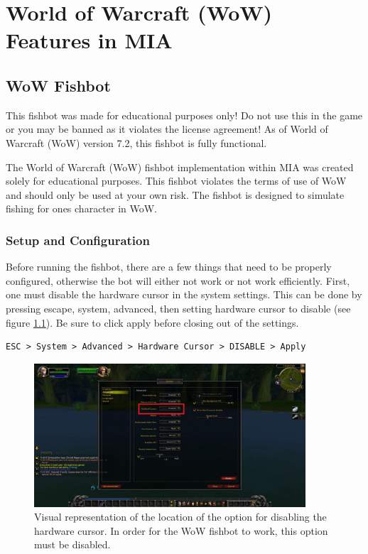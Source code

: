 \chapter{World of Warcraft (WoW) Features in MIA} \label{WoW}
\pagestyle{fancy}

\section{WoW Fishbot} \label{WoWFishbot}

\begin{note}
	This fishbot was made for educational purposes only! Do not use this in the game or you may be banned as it violates the license agreement! As of World of Warcraft (WoW) version 7.2, this fishbot is fully functional.
\end{note}

The World of Warcraft (WoW) fishbot implementation within MIA was created solely for educational purposes. This fishbot violates the terms of use of WoW and should only be used at your own risk. The fishbot is designed to simulate fishing for ones character in WoW. 

\subsection{Setup and Configuration}

Before running the fishbot, there are a few things that need to be properly configured, otherwise the bot will either not work or not work efficiently. First, one must disable the hardware cursor in the system settings. This can be done by pressing escape, system, advanced, then setting hardware cursor to disable (see figure \ref{hardwar cursor}). Be sure to click apply before closing out of the settings.

\begin{lstlisting}
ESC > System > Advanced > Hardware Cursor > DISABLE > Apply
\end{lstlisting}

\begin{figure}[h]
	\centering
	\includegraphics[width=0.9\textwidth]{Images/WoWScrnShot_040118_234154.jpg}
	\caption{Visual representation of the location of the option for disabling the hardware cursor. In order for the WoW fishbot to work, this option must be disabled.} \label{hardwar cursor}
\end{figure}

